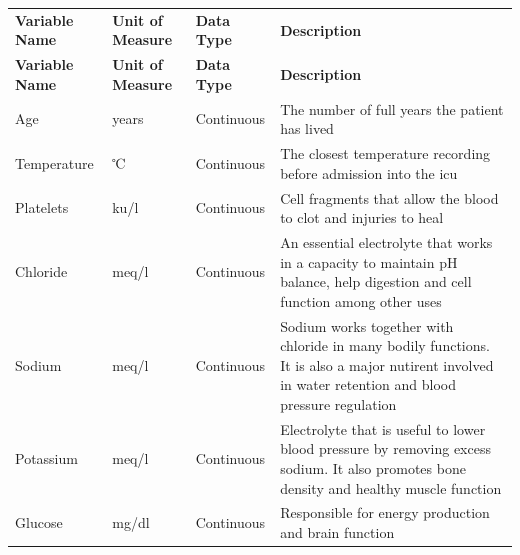\documentclass[11pt]{article}
\begin{document}
{\seriffont
{\small
\renewcommand{\arraystretch}{1}
\centering
\begin{center}
\setlength{\arrayrulewidth}{0.7mm}
\begin{longtable}{ |L{2cm} | L{2cm} | L{2cm} | 
 L{7cm} |} 
    \hline
    \textbf{Variable Name} & \textbf{Unit of Measure} & \textbf{Data Type} & \textbf{Description} 
 \\ 
    \noalign{\global\setlength{\arrayrulewidth}{0.7mm}}
    \hline
    \endfirsthead

\hline
\textbf{Variable Name} & \textbf{Unit of Measure} & \textbf{Data Type} & \textbf{Description}  \\
\hline
\endhead
  Age & years & Continuous & The number of full years the patient has lived \\ 
    \noalign{\global\setlength{\arrayrulewidth}{0.05mm}}
    \hline
    \noalign{\global\setlength{\arrayrulewidth}{0.7mm}}
 Temperature & ℃ & Continuous & The closest temperature recording before admission into the \gls{icu}\\ 
    \noalign{\global\setlength{\arrayrulewidth}{0.05mm}}
    \hline
    \noalign{\global\setlength{\arrayrulewidth}{0.7mm}}
  Platelets & \gls{ku/l}  & Continuous  & Cell fragments that allow the blood to clot and injuries to heal\\ 
    \noalign{\global\setlength{\arrayrulewidth}{0.05mm}}
    \hline
    \noalign{\global\setlength{\arrayrulewidth}{0.7mm}}
  Chloride & \gls{meq/l} & Continuous & An essential electrolyte that works in a capacity to maintain pH balance, help digestion and cell function among other uses\\ 
    \noalign{\global\setlength{\arrayrulewidth}{0.05mm}}
    \hline
    \noalign{\global\setlength{\arrayrulewidth}{0.7mm}}
  Sodium & \gls{meq/l} & Continuous & Sodium works together with chloride in many bodily functions. It is also a major nutirent involved in water retention and blood pressure regulation \\ 
    \noalign{\global\setlength{\arrayrulewidth}{0.05mm}}
    \hline
    \noalign{\global\setlength{\arrayrulewidth}{0.7mm}}
  Potassium & \gls{meq/l} & Continuous & Electrolyte that is useful to lower blood pressure by removing excess sodium. It also promotes bone density and healthy muscle function\\ 
    \noalign{\global\setlength{\arrayrulewidth}{0.05mm}}
    \hline
    \noalign{\global\setlength{\arrayrulewidth}{0.7mm}}
  Glucose & \gls{mg/dl} & Continuous & Responsible for energy production and brain function\\ 

\end{longtable}
\end{center}}}
\end{document}
